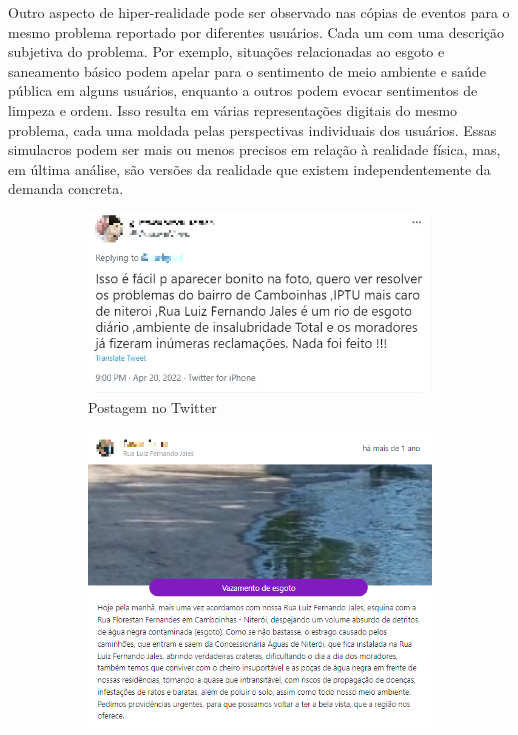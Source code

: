 Outro aspecto de hiper-realidade pode ser observado nas cópias de eventos para o mesmo problema reportado por diferentes usuários. Cada um com uma descrição subjetiva do problema. Por exemplo, situações relacionadas ao esgoto e saneamento básico podem apelar para o sentimento de meio ambiente e saúde pública em alguns usuários, enquanto a outros podem evocar sentimentos de limpeza e ordem. Isso resulta em várias representações digitais do mesmo problema, cada uma moldada pelas perspectivas individuais dos usuários. Essas simulacros podem ser mais ou menos precisos em relação à realidade física, mas, em última análise, são versões da realidade que existem independentemente da demanda concreta.

\begin{figure}[!htb]
	\centering
	\begin{subfigure}{0.4\textwidth}
		\centering
		\includegraphics[width=\linewidth]{images/colab_hiper_reality_corr_01.png}
		\caption{Postagem no Twitter}
		\label{fig:colab_hiper_reality_corr_01}
	\end{subfigure}
	\hspace{5mm}
	\begin{subfigure}{0.6\textwidth}
		\centering
		\includegraphics[width=\linewidth]{images/colab_hiper_reality_corr_02.PNG}

\end{subfigure}
\end{figure}
